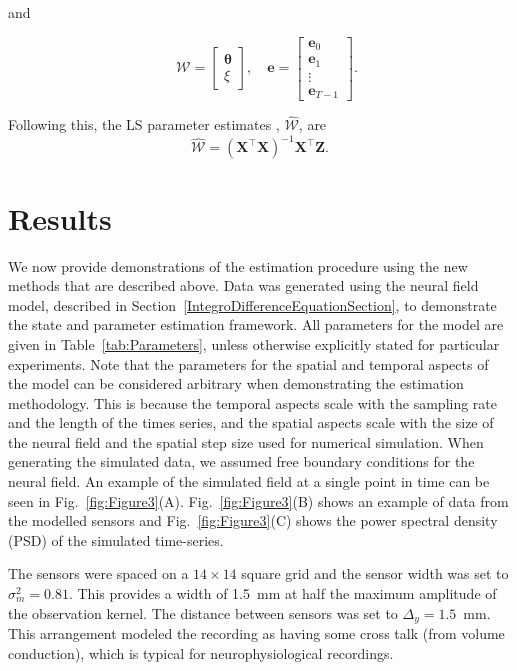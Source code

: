 \documentclass[review,authoryear,3p]{elsarticle}
\begin{document}
and
\begin{small}
\begin{equation*}
\quad \mathcal W=\left[
	\begin{array}{cc}
		\boldsymbol{\theta} \\
		\xi
	\end{array}
	\right],\quad \mathbf{e}=\left[
	\begin{array}{cccc}
		\mathbf e_0\\
		\mathbf e_1\\
		\vdots\\
		\mathbf e_{T-1}
	\end{array}
	\right].
\end{equation*}
\end{small}
Following this, the LS parameter estimates \citep{Ljung1985}, $ \hat{\mathcal{W}}$, are
\begin{equation}
	\hat{\mathcal{W}}=(\mathbf X^\top\mathbf X)^{-1}\mathbf X^\top\mathbf Z. 
\end{equation}

\section{Results}\label{ResultsSection} We now provide demonstrations of the estimation procedure using the new methods that are described above. Data was generated using the neural field model, described in Section~\ref{IntegroDifferenceEquationSection}, to demonstrate the state and parameter estimation framework. All parameters for the model are given in Table~\ref{tab:Parameters}, unless otherwise explicitly stated for particular experiments. Note that the parameters for the spatial and temporal aspects of the model can be considered arbitrary when demonstrating the estimation methodology. This is because the temporal aspects scale with the sampling rate and the length of the times series, and the spatial aspects scale with the size of the neural field and the spatial step size used for numerical simulation. When generating the simulated data, we assumed free boundary conditions for the neural field. An example of the simulated field at a single point in time can be seen in Fig.~\ref{fig:Figure3}(A). Fig.~\ref{fig:Figure3}(B) shows an example of data from the modelled sensors and Fig.~\ref{fig:Figure3}(C) shows the power spectral density (PSD) of the simulated time-series. %

The sensors were spaced on a $14 \times 14$ square grid and the sensor width was set to $\sigma^2_m = 0.81$. This provides a width of 1.5~mm at half the maximum amplitude of the observation kernel. The distance between sensors was set to $\Delta_y = 1.5$~mm. This arrangement modeled the recording as having some cross talk (from volume conduction), which is typical for neurophysiological recordings.
\end{document}
